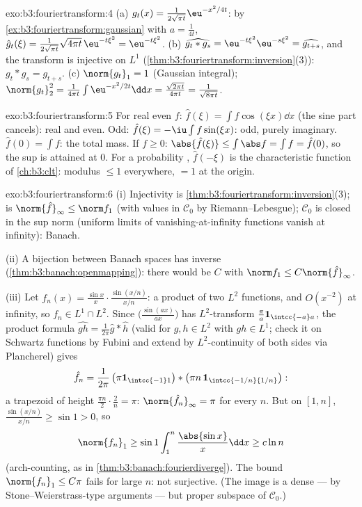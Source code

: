 \begin{solution}{exo:b3:fouriertransform:4}
(a) $g_t(x) = \frac1{2\sqrt{\pi t}}\eu^{-x^2/4t}$: by
\cref{ex:b3:fouriertransform:gaussian} with $a = \frac1{4t}$,
$\hat g_t(\xi) = \frac1{2\sqrt{\pi t}}\sqrt{4\pi
t}\,\eu^{-t\xi^2} = \eu^{-t\xi^2}$.
(b) $\widehat{g_t * g_s} = \eu^{-t\xi^2}\eu^{-s\xi^2} =
\widehat{g_{t+s}}$, and the transform is injective on $L^1$
(\cref{thm:b3:fouriertransform:inversion}(3)): $g_t * g_s =
g_{t+s}$.
(c) $\norm{g_t}_1 = 1$ (Gaussian integral);
$\norm{g_t}_2^2 = \frac1{4\pi t}\int\eu^{-x^2/2t}\dd x =
\frac{\sqrt{2\pi t}}{4\pi t} = \frac1{\sqrt{8\pi t}}$.
\end{solution}

\begin{solution}{exo:b3:fouriertransform:5}
For real even $f$: $\hat f(\xi) = \int f\cos(\xi x)\dd x$ (the
sine part cancels): real and even. Odd: $\hat f(\xi) =
-\iu\int f\sin(\xi x)$: odd, purely imaginary. $\hat f(0) =
\int f$: the total mass. If $f \geq 0$: $\abs{\hat f(\xi)}
\leq \int\abs f = \int f = \hat f(0)$, so the sup is attained
at $0$. For a probability , $\hat f(-\xi)$ is the
characteristic function of \cref{ch:b3:clt}: modulus $\leq 1$
everywhere, $= 1$ at the origin.
\end{solution}

\begin{solution}{exo:b3:fouriertransform:6}
(i) Injectivity is
\cref{thm:b3:fouriertransform:inversion}(3);  is
$\norm{\hat f}_\infty \leq \norm f_1$ (with values in
$\mathcal C_0$ by Riemann--Lebesgue); $\mathcal C_0$ is closed
in the sup norm (uniform limits of vanishing-at-infinity
functions vanish at infinity): Banach.

(ii) A  bijection between Banach spaces has
 inverse (\cref{thm:b3:banach:openmapping}): there
would be $C$ with $\norm f_1 \leq C\norm{\hat f}_\infty$.

(iii) Let $f_n(x) = \frac{\sin x}x\cdot\frac{\sin(x/n)}{x/n}$:
a product of two $L^2$ functions, and $O(x^{-2})$ at
infinity, so $f_n \in L^1\cap L^2$. Since
$\bigl(\frac{\sin(ax)}{ax}\bigr)$ has $L^2$-transform
$\frac\pi a\mathbf 1_{\intcc{-a}a}$, the product formula
$\widehat{gh} = \frac1{2\pi}\hat g * \hat h$ (valid for $g, h
\in L^2$ with $gh \in L^1$; check it on Schwartz functions by
Fubini and extend by $L^2$-continuity of both sides via
Plancherel) gives
\[
\hat f_n = \frac1{2\pi}\,\bigl(\pi\mathbf
1_{\intcc{-1}1}\bigr) * \bigl(\pi n\,\mathbf
1_{\intcc{-1/n}{1/n}}\bigr):
\]
a trapezoid of height $\frac{\pi n}2\cdot\frac2n = \pi$:
$\norm{\hat f_n}_\infty = \pi$ for every $n$. But on $[1,
n]$, $\frac{\sin(x/n)}{x/n} \geq \sin 1 > 0$, so
\[
\norm{f_n}_1 \geq \sin 1\int_1^n\frac{\abs{\sin x}}x\dd x
\geq c\ln n
\]
(arch-counting, as in \cref{thm:b3:banach:fourierdiverge}).
The bound $\norm{f_n}_1 \leq C\pi$ fails for large $n$: not
surjective. (The image is a dense --- by
Stone--Weierstrass-type arguments --- but proper subspace of
$\mathcal C_0$.)
\end{solution}

